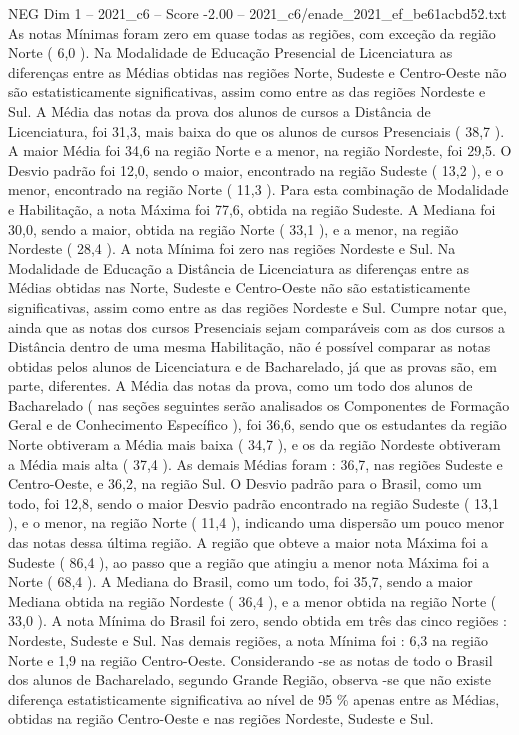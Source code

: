 \begin{textsample}{NEG Dim 1 – 2021\_c6 – Score -2.00 – 2021\_c6/enade\_2021\_ef\_be61acbd52.txt}
As notas Mínimas foram zero em quase todas as regiões, com exceção da região Norte ( 6,0 ).
Na Modalidade de Educação Presencial de Licenciatura as diferenças entre as Médias obtidas nas regiões Norte, Sudeste e Centro-Oeste não são estatisticamente significativas, assim como entre as das regiões Nordeste e Sul.
A Média das notas da prova dos alunos de cursos a Distância de Licenciatura, foi 31,3, mais baixa do que os alunos de cursos Presenciais ( 38,7 ).
A maior Média foi 34,6 na região Norte e a menor, na região Nordeste, foi 29,5.
O Desvio padrão foi 12,0, sendo o maior, encontrado na região Sudeste ( 13,2 ), e o menor, encontrado na região Norte ( 11,3 ).
Para esta combinação de Modalidade e Habilitação, a nota Máxima foi 77,6, obtida na região Sudeste.
A Mediana foi 30,0, sendo a maior, obtida na região Norte ( 33,1 ), e a menor, na região Nordeste ( 28,4 ).
A nota Mínima foi zero nas regiões Nordeste e Sul.
Na Modalidade de Educação a Distância de Licenciatura as diferenças entre as Médias obtidas nas Norte, Sudeste e Centro-Oeste não são estatisticamente significativas, assim como entre as das regiões Nordeste e Sul.
Cumpre notar que, ainda que as notas dos cursos Presenciais sejam comparáveis com as dos cursos a Distância dentro de uma mesma Habilitação, não é possível comparar as notas obtidas pelos alunos de Licenciatura e de Bacharelado, já que as provas são, em parte, diferentes.
A Média das notas da prova, como um todo dos alunos de Bacharelado ( nas seções seguintes serão analisados os Componentes de Formação Geral e de Conhecimento Específico ), foi 36,6, sendo que os estudantes da região Norte obtiveram a Média mais baixa ( 34,7 ), e os da região Nordeste obtiveram a Média mais alta ( 37,4 ).
As demais Médias foram : 36,7, nas regiões Sudeste e Centro-Oeste, e 36,2, na região Sul.
O Desvio padrão para o Brasil, como um todo, foi 12,8, sendo o maior Desvio padrão encontrado na região Sudeste ( 13,1 ), e o menor, na região Norte ( 11,4 ), indicando uma dispersão um pouco menor das notas dessa última região.
A região que obteve a maior nota Máxima foi a Sudeste ( 86,4 ), ao passo que a região que atingiu a menor nota Máxima foi a Norte ( 68,4 ).
A Mediana do Brasil, como um todo, foi 35,7, sendo a maior Mediana obtida na região Nordeste ( 36,4 ), e a menor obtida na região Norte ( 33,0 ).
A nota Mínima do Brasil foi zero, sendo obtida em três das cinco regiões : Nordeste, Sudeste e Sul.
Nas demais regiões, a nota Mínima foi : 6,3 na região Norte e 1,9 na região Centro-Oeste.
Considerando -se as notas de todo o Brasil dos alunos de Bacharelado, segundo Grande Região, observa -se que não existe diferença estatisticamente significativa ao nível de 95 \% apenas entre as Médias, obtidas na região Centro-Oeste e nas regiões Nordeste, Sudeste e Sul.

\end{textsample}
